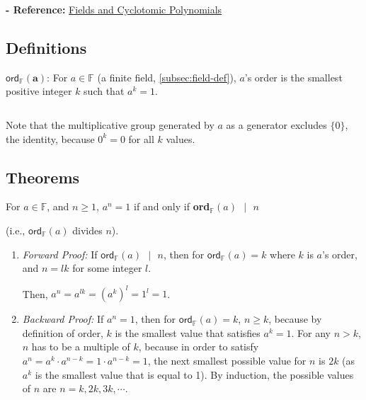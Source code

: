 \textbf{- Reference:} 
\href{https://e.math.cornell.edu/people/belk/numbertheory/CyclotomicPolynomials.pdf}{Fields and Cyclotomic Polynomials}~\cite{cyclotomic-polynomial}

\subsection{Definitions}
\label{subsec:order-def}

\begin{tcolorbox}[title={\textbf{\tboxdef{\ref*{subsec:order-def}} Order Definition}}]
$\bm{\textsf{ord}_{\mathbb{F}}(a)}$: For $a \in \mathbb{F}$ (a finite field, \autoref{subsec:field-def}), $a$'s order is the smallest positive integer $k$ such that $a^k = 1$. 

$ $


\end{tcolorbox}

Note that the multiplicative group generated by $a$ as a generator excludes $\{0\}$, the identity, because $0^k = 0$ for all $k$ values.

\subsection{Theorems}
\label{subsec:order-theorem}



\begin{tcolorbox}[title={\textbf{\tboxtheorem{\ref*{subsec:order-theorem}.1} Order Property (I)}}]
For $a \in \mathbb{F}$, and $n \geq 1$, $a^n = 1$ if and only if \textbf{\textsf{ord}}$_{\mathbb{F}}(a) \text{ } | \text{ } n$ 

(i.e., $\textsf{ord}_{\mathbb{F}}(a)$ divides $n$).
\end{tcolorbox}

\begin{myproof}
    \begin{enumerate}
    \item \textit{Forward Proof:} If $\textsf{ord}_{\mathbb{F}}(a) \text{ } | \text{ } n$, then for $\textsf{ord}_{\mathbb{F}}(a) = k$ where $k$ is $a$'s order, and $n = lk$ for some integer $l$. 
    
    Then, $a^n = a^{lk} = (a^k)^l = 1^l = 1$.
    \item \textit{Backward Proof:} If $a^n = 1$, then for $\textsf{ord}_{\mathbb{F}}(a) = k$, $n \geq k$, because by definition of order, $k$ is the smallest value that satisfies $a^k = 1$. For any $n > k$, $n$ has to be a multiple of $k$, because in order to satisfy $a^n = a^k \cdot a^{n - k} = 1 \cdot a^{n - k} = 1$, the next smallest possible value for $n$ is $2k$ (as $a^k$ is the smallest value that is equal to 1). By induction, the possible values of $n$ are $n = k, 2k, 3k, \cdots$.
    \end{enumerate}
\end{myproof}



